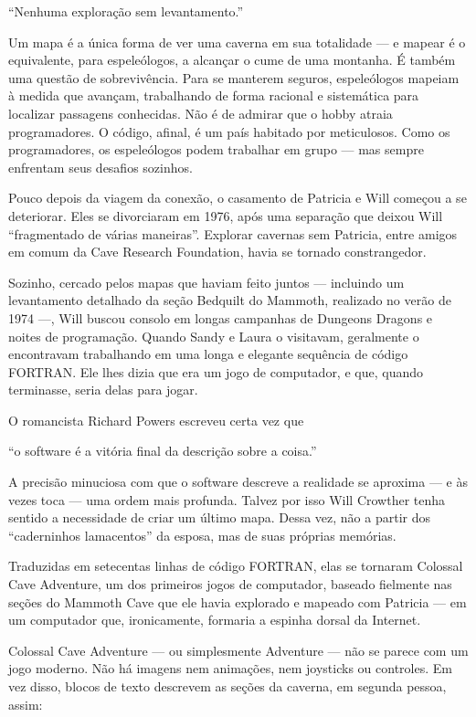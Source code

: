 \documentclass[12pt,a4paper]{article}
\begin{document}
“Nenhuma exploração sem levantamento.”

Um mapa é a única forma de ver uma caverna em sua totalidade — e mapear é o equivalente, para espeleólogos, a alcançar o cume de uma montanha.
É também uma questão de sobrevivência.
Para se manterem seguros, espeleólogos mapeiam à medida que avançam, trabalhando de forma racional e sistemática para localizar passagens conhecidas.
Não é de admirar que o hobby atraia programadores.
O código, afinal, é um país habitado por meticulosos.
Como os programadores, os espeleólogos podem trabalhar em grupo — mas sempre enfrentam seus desafios sozinhos.

Pouco depois da viagem da conexão, o casamento de Patricia e Will começou a se deteriorar.
Eles se divorciaram em 1976, após uma separação que deixou Will “fragmentado de várias maneiras”.
Explorar cavernas sem Patricia, entre amigos em comum da Cave Research Foundation, havia se tornado constrangedor.

Sozinho, cercado pelos mapas que haviam feito juntos — incluindo um levantamento detalhado da seção Bedquilt do Mammoth, realizado no verão de 1974 —, Will buscou consolo em longas campanhas de Dungeons Dragons e noites de programação.
Quando Sandy e Laura o visitavam, geralmente o encontravam trabalhando em uma longa e elegante sequência de código FORTRAN.
Ele lhes dizia que era um jogo de computador, e que, quando terminasse, seria delas para jogar.

O romancista Richard Powers escreveu certa vez que

“o software é a vitória final da descrição sobre a coisa.”

A precisão minuciosa com que o software descreve a realidade se aproxima — e às vezes toca — uma ordem mais profunda.
Talvez por isso Will Crowther tenha sentido a necessidade de criar um último mapa.
Dessa vez, não a partir dos “caderninhos lamacentos” da esposa, mas de suas próprias memórias.

Traduzidas em setecentas linhas de código FORTRAN, elas se tornaram Colossal Cave Adventure,
um dos primeiros jogos de computador, baseado fielmente nas seções do Mammoth Cave que ele havia explorado e mapeado com Patricia —
em um computador que, ironicamente, formaria a espinha dorsal da Internet.

Colossal Cave Adventure — ou simplesmente Adventure —
não se parece com um jogo moderno.
Não há imagens nem animações, nem joysticks ou controles.
Em vez disso, blocos de texto descrevem as seções da caverna, em segunda pessoa, assim:
\end{document}
